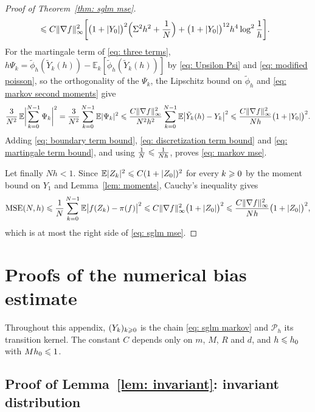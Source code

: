 \begin{proof}[Proof of Theorem~\ref{thm: sglm mse}]
\begin{equation}
\begin{aligned}
        & \leqslant C \lVert \nabla f \rVert_\infty^2 \biggl[ \bigl( 1+|Y_0| \bigr)^2 \Bigl( \Sigma^2 h^2 + \frac1N \Bigr) + \bigl( 1+|Y_0| \bigr)^{12} h^4 \log^2\frac1h \biggr] .
    \end{aligned}
        \label{eq: discretization term bound}
    \end{equation}
    For the martingale term of \eqref{eq: three terms}, $h \Psi_k = \tilde\phi_h(\tilde Y_k(h)) - \mathbb E_k[\tilde\phi_h(\tilde Y_k(h))]$ by \eqref{eq: Upsilon Psi} and \eqref{eq: modified poisson}, so the orthogonality of the $\Psi_k$, the Lipschitz bound on $\tilde\phi_h$ and \eqref{eq: markov second moments} give
    \begin{equation}
        \frac{3}{N^2}\, \mathbb E\biggl| \sum_{k=0}^{N-1} \Psi_k \biggr|^2 = \frac{3}{N^2} \sum_{k=0}^{N-1} \mathbb E|\Psi_k|^2 \leqslant \frac{C \lVert \nabla f \rVert_\infty^2}{N^2 h^2} \sum_{k=0}^{N-1} \mathbb E\bigl| \tilde Y_k(h) - Y_k \bigr|^2 \leqslant \frac{C \lVert \nabla f \rVert_\infty^2}{Nh} \bigl( 1+|Y_0| \bigr)^2 .
        \label{eq: martingale term bound}
    \end{equation}
    Adding \eqref{eq: boundary term bound}, \eqref{eq: discretization term bound} and \eqref{eq: martingale term bound}, and using $\frac{1}{N} \leqslant \frac{1}{Nh}$, proves \eqref{eq: markov mse}.

    Let finally $Nh < 1$. Since $\mathbb E|Z_k|^2 \leqslant C (1 + |Z_0|)^2$ for every $k \geqslant 0$ by the moment bound on $Y_1$ and Lemma~\ref{lem: moments}, Cauchy's inequality gives
    \begin{equation*}
        \mathrm{MSE}(N,h) \leqslant \frac1N \sum_{k=0}^{N-1} \mathbb E\bigl| f(Z_k) - \pi(f) \bigr|^2 \leqslant C \lVert \nabla f \rVert_\infty^2 \bigl( 1 + |Z_0| \bigr)^2 \leqslant \frac{C \lVert \nabla f \rVert_\infty^2}{Nh} \bigl( 1 + |Z_0| \bigr)^2 ,
    \end{equation*}
    which is at most the right side of \eqref{eq: sglm mse}.
\end{proof}

\section{Proofs of the numerical bias estimate}
\label{app: bias}

Throughout this appendix, $(Y_k)_{k \geqslant 0}$ is the chain \eqref{eq: sglm markov} and $\mathcal P_h$ its transition kernel. The constant $C$ depends only on $m$, $M$, $R$ and $d$, and $h \leqslant h_0$ with $M h_0 \leqslant 1$.

\subsection{Proof of Lemma~\ref{lem: invariant}: invariant distribution}
\label{sec: invariant proof}


